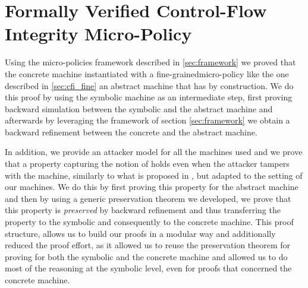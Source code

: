\chapter{Formally Verified Control-Flow Integrity Micro-Policy}
\label{ch:verified_cfi}

Using the micro-policies framework described in \cref{sec:framework}
we proved that the concrete machine instantiated with a
fine-grained\CFI micro-policy like the one described in
\cref{sec:cfi_fine}  an abstract machine that has \CFI
by construction. We do this proof by using the symbolic machine as an
intermediate step, first proving backward simulation between the symbolic
and the abstract machine and afterwards by leveraging the framework of
section \cref{sec:framework} we obtain a backward refinement between
the concrete and the abstract machine.

In addition, we provide an attacker model for all the machines used
and we prove that a property capturing the notion of \CFI holds even
when the attacker tampers with the machine, similarly to what is
proposed in \cite{AbadiBEL09}, but adapted to the setting of our
machines. We do this by first proving this property for the abstract
machine and then by using a generic preservation theorem we developed,
we prove that this property is \emph{preserved} by backward
refinement and thus transferring the property to the symbolic and
consequently to the concrete machine. This proof structure, allows us to
build our proofs in a modular way and additionally reduced the proof
effort, as it allowed us to reuse the preservation theorem for proving
\CFI for both the symbolic and the concrete machine and allowed us to
do most of the reasoning at the symbolic level, even for proofs that
concerned the concrete machine.

